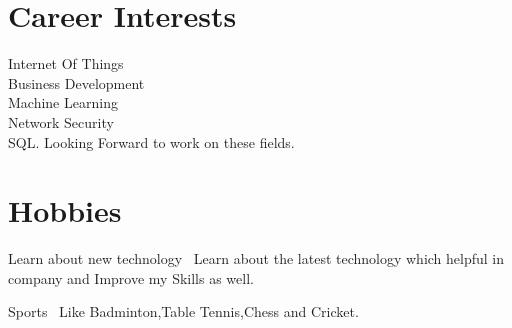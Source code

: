\documentclass[]{cv-style}          %
\begin{document}

\section{Career Interests}
    \vspace{-0.2cm}
    
\begin{entrylist}

\entry
{}
{Internet Of Things\\
Business Development\\
Machine Learning\\
Network Security\\
SQL.
}
{}
{Looking Forward to work on these fields.}

\end{entrylist}






\section{Hobbies}
  \vspace{-0.2cm}

\begin{entrylist}

\entry
  {}
  {Learn about new  technology }
  {}
  {\jobtitle{}\ Learn about the latest technology which helpful in company and Improve my
     Skills as well.}
  

  \entry
  {}
  {Sports }
  {}
  {\jobtitle{}\ Like Badminton,Table Tennis,Chess and Cricket. }
  
 

\end{entrylist}
\end{document}
